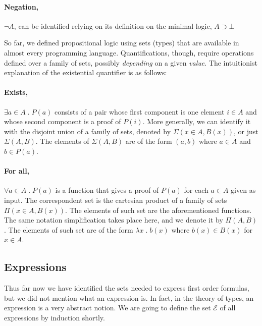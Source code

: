 \paragraph{Negation,} $\neg A$, can be identified relying on its definition
on the minimal logic, $A \supset \bot$

So far, we defined propositional logic using sets (types) that are available in almost every
programming language. Quantifications, though, require operations defined over a 
family of sets, possibly \emph{depending} on a given \emph{value}. The intuitionist explanation
of the existential quantifier is as follows:

\paragraph{Exists,} $\exists a \in A \; . \; P(a)$ consists of a pair whose first
component is one element $i \in A$ and whose second component is a proof of $P(i)$. More generally,
we can identify it with the disjoint union of a family of sets, denoted by $\Sigma(x \in A, B(x))$,
or just $\Sigma(A, B)$. The elements of $\Sigma(A, B)$ are of the form $(a, b)$ where $a \in A$ and
$b \in P(a)$.

\paragraph{For all,} $\forall a \in A \; . \; P(a)$ is a function that gives a proof of $P(a)$
for each $a \in A$ given as input. The correspondent set is the cartesian product of a family
of sets $\Pi(x \in A, B(x))$. The elements of such set are the aforementioned functions. The same
notation simplification takes place here, and we denote it by $\Pi(A, B)$. The elements of such set
are of the form $\lambda x\;.\;b(x)$ where $b(x) \in B(x)$ for $x \in A$. 

\subsection{Expressions}

Thus far now we have identified the sets needed to express first order formulas, but we
did not mention what an expression is. In fact, in the theory of types, an expression is a
very abstract notion. We are going to define the set $\mathcal{E}$ of all expressions by induction shortly.

